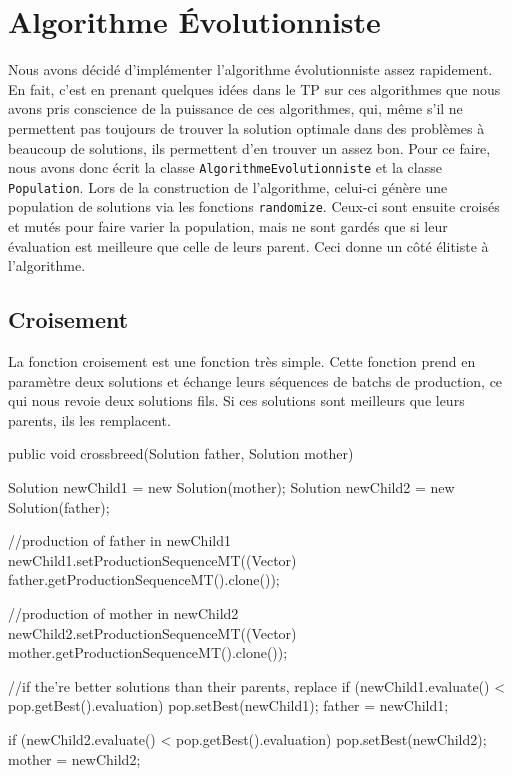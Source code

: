 \section{Algorithme Évolutionniste}
Nous avons décidé d'implémenter l'algorithme évolutionniste assez rapidement. En fait, c'est en prenant quelques idées dans le TP sur ces algorithmes que nous avons pris conscience de la puissance de ces algorithmes, qui, même s'il ne permettent pas toujours de trouver la solution optimale dans des problèmes à beaucoup de solutions, ils permettent d'en trouver un assez bon.
\vspace{1em}
Pour ce faire, nous avons donc écrit la classe \verb!AlgorithmeEvolutionniste! et la classe \verb!Population!. Lors de la construction de l'algorithme, celui-ci génère une population de solutions via les fonctions \verb!randomize!. Ceux-ci sont ensuite croisés et mutés pour faire varier la population, mais ne sont gardés que si leur évaluation est meilleure que celle de leurs parent. Ceci donne un côté élitiste à l'algorithme.

\subsection{Croisement}
La fonction croisement est une fonction très simple. Cette fonction prend en paramètre deux solutions et échange leurs séquences de batchs de production, ce qui nous revoie deux solutions fils. Si ces solutions sont meilleurs que leurs parents, ils les remplacent.

\begin{java}
public void crossbreed(Solution father, Solution mother) {
	Solution newChild1 = new Solution(mother);
	Solution newChild2 = new Solution(father);
	
	//production of father in newChild1
	newChild1.setProductionSequenceMT((Vector) father.getProductionSequenceMT().clone());
	
	//production of mother in newChild2
	newChild2.setProductionSequenceMT((Vector) mother.getProductionSequenceMT().clone());
	
	//if the're better solutions than their parents, replace
	if (newChild1.evaluate() < pop.getBest().evaluation) {
		pop.setBest(newChild1);
		father = newChild1;
	}
	
	if (newChild2.evaluate() < pop.getBest().evaluation) {
		pop.setBest(newChild2);
		mother = newChild2;
	}
}
\end{java}

\vspace{1em}

